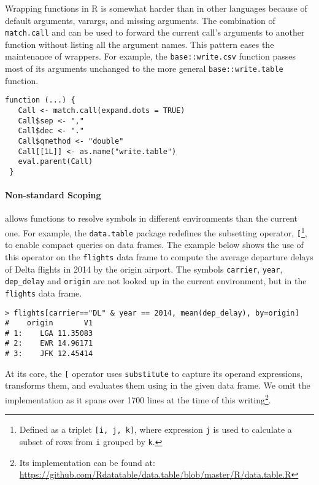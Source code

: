 \documentclass[acmsmall, screen]{acmart}
\renewcommand{\k}[1]{\lstinline |#1|\xspace}
\begin{document}
Wrapping functions in R is somewhat harder than in other languages because of
default arguments, varargs, and missing arguments. The combination of
\k{match.call} and \eval can be used to forward the current call's arguments to
another function without listing all the argument names. This pattern eases the
maintenance of wrappers. For example, the \k{base::write.csv} function passes
most of its arguments unchanged to the more general \k{base::write.table}
function.

\begin{lstlisting}[caption={\k{base::write.csv}}, captionpos=b]
 function (...) {
   Call <- match.call(expand.dots = TRUE)
   Call$sep <- ","
   Call$dec <- "."
   Call$qmethod <- "double"
   Call[[1L]] <- as.name("write.table")
   eval.parent(Call)
 }
\end{lstlisting}\medskip

\paragraph{Non-standard Scoping}

\Eval allows functions to resolve symbols in different environments than the
current one. For example, the \k{data.table} package redefines the subsetting
operator, \k{[}\footnote{Defined as a triplet \texttt{[i, j, k]}, where
  expression \texttt{j} is used to calculate a subset of rows from \texttt{i}
  grouped by \texttt{k}.}, to enable compact queries on data frames. The example
below shows the use of this operator on the \k{flights} data frame to compute
the average departure delays of Delta flights in 2014 by the origin airport. The
symbols \k{carrier}, \k{year}, \k{dep_delay} and \k{origin} are not looked up in
the current environment, but in the \k{flights} data frame.

\begin{lstlisting}[caption={\k{data.table::[}}, captionpos=b]
> flights[carrier=="DL" & year == 2014, mean(dep_delay), by=origin]
#    origin       V1
# 1:    LGA 11.35083
# 2:    EWR 14.96171
# 3:    JFK 12.45414
\end{lstlisting}\medskip

At its core, the \k{[} operator uses \k{substitute} to capture its operand
expressions, transforms them, and evaluates them using \eval in the given data
frame. We omit the implementation as it spans over 1700 lines at the time of
this writing\footnote{Its implementation can be found at:
  \url{https://github.com/Rdatatable/data.table/blob/master/R/data.table.R}}.
\end{document}
